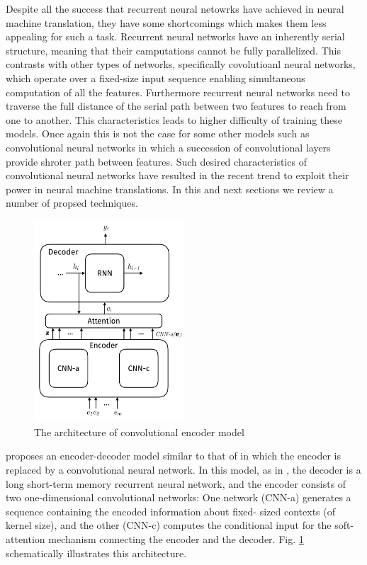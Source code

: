\documentclass[a4paper]{article}
\begin{document}
Despite all the success that recurrent neural  netowrks  have achieved in neural
machine translation, they have some shortcomings which makes them less appealing
for such a task. Recurrent neural networks have an inherently serial  structure,
meaning that their  camputations  cannot  be  fully parallelized. This contrasts
with  other types of networks, specifically covolutioanl neural  networks, which
operate  over a  fixed-size input sequence enabling simultaneous computation  of
all the features. Furthermore  recurrent  neural networks need  to traverse  the
full distance of  the serial  path  between  two features  to reach from one  to
another. This characteristics  leads  to  higher  difficulty  of  training these
models. Once  again  this  is  not  the  case  for some  other  models  such  as
convolutional neural networks in  which  a succession  of  convolutional  layers
provide shroter  path  between features.  \cite{DBLP:journals/corr/GehringAGD16}
Such  desired characteristics  of convolutional neural networks have resulted in
the recent trend to exploit their power in neural machine  translations. In this
and next sections we review a number of propsed techniques.


\begin{figure}
  \center
  \includegraphics[width=0.5\textwidth]{img/CE}
  \caption{The architecture of convolutional encoder model}
  \label{fig:convenc}
\end{figure}


\citet{DBLP:journals/corr/GehringAGD16}   proposes   an   encoder-decoder  model
similar to that of \cite{bahdanau2014neural} in which the encoder is replaced by
a convolutional neural network. In this model, as  in \cite{bahdanau2014neural},
the  decoder  is a  long short-term memory  recurrent  neural  network,  and the
encoder  consists  of two  one-dimensional  convolutional  networks: One network
(CNN-a) generates a  sequence containing  the encoded information about fixed-
sized  contexts  (of  kernel  size),  and   the  other  (CNN-c)  computes  the
conditional input  for the  soft-attention  mechanism connecting the encoder and
the decoder. Fig. \ref{fig:convenc} schematically illustrates this architecture.
\end{document}
